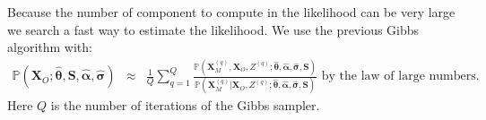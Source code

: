 \documentclass[12pt,a4paper]{report}
\begin{document}
%	
	Because the number of component to compute in the likelihood can be very large we search a fast way to estimate the likelihood.
%	
	 We use the previous Gibbs algorithm with:
	\begin{eqnarray}
	\mathbb{P}(\boldsymbol{X}_O;\hat{\boldsymbol{\theta}}, \boldsymbol{S}, \hat{\boldsymbol{\alpha}},\hat{\boldsymbol{\sigma}})&\approx & \frac{1}{Q} \sum_{q=1}^Q
	\frac{\mathbb{P}(\boldsymbol{X}_M^{(q)},\boldsymbol{X}_O,Z^{(q)};\hat{\boldsymbol{\theta}},\hat{\boldsymbol{\alpha}},\hat{\boldsymbol{\sigma}},\boldsymbol{S})}
	{\mathbb{P}(\boldsymbol{X}_M^{(q)}|\boldsymbol{X}_O,Z^{(q)};\hat{\boldsymbol{\theta}},\hat{\boldsymbol{\alpha}},\hat{\boldsymbol{\sigma}},\boldsymbol{S})} \textrm{ by the law of large numbers. } \ \ \ \nonumber
	\end{eqnarray}	
	Here $Q$ is the number of iterations of the Gibbs sampler.%
\end{document}
